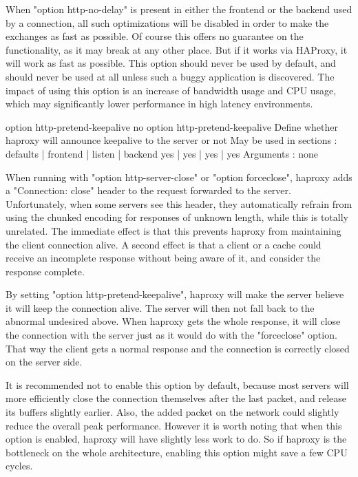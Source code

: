   When "option http-no-delay" is present in either the frontend or the backend
  used by a connection, all such optimizations will be disabled in order to
  make the exchanges as fast as possible. Of course this offers no guarantee on
  the functionality, as it may break at any other place. But if it works via
  HAProxy, it will work as fast as possible. This option should never be used
  by default, and should never be used at all unless such a buggy application
  is discovered. The impact of using this option is an increase of bandwidth
  usage and CPU usage, which may significantly lower performance in high
  latency environments.


option http-pretend-keepalive
no option http-pretend-keepalive
  Define whether haproxy will announce keepalive to the server or not
  May be used in sections :   defaults | frontend | listen | backend
                                 yes   |    yes   |   yes  |   yes
  Arguments : none

  When running with "option http-server-close" or "option forceclose", haproxy
  adds a "Connection: close" header to the request forwarded to the server.
  Unfortunately, when some servers see this header, they automatically refrain
  from using the chunked encoding for responses of unknown length, while this
  is totally unrelated. The immediate effect is that this prevents haproxy from
  maintaining the client connection alive. A second effect is that a client or
  a cache could receive an incomplete response without being aware of it, and
  consider the response complete.

  By setting "option http-pretend-keepalive", haproxy will make the server
  believe it will keep the connection alive. The server will then not fall back
  to the abnormal undesired above. When haproxy gets the whole response, it
  will close the connection with the server just as it would do with the
  "forceclose" option. That way the client gets a normal response and the
  connection is correctly closed on the server side.

  It is recommended not to enable this option by default, because most servers
  will more efficiently close the connection themselves after the last packet,
  and release its buffers slightly earlier. Also, the added packet on the
  network could slightly reduce the overall peak performance. However it is
  worth noting that when this option is enabled, haproxy will have slightly
  less work to do. So if haproxy is the bottleneck on the whole architecture,
  enabling this option might save a few CPU cycles.

